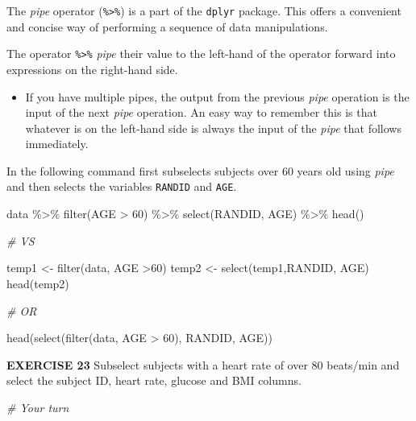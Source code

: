 \documentclass[
]{article}
\newenvironment{Shaded}{\begin{snugshade}}{\end{snugshade}}
\newcommand{\CommentTok}[1]{\textcolor[rgb]{0.56,0.35,0.01}{\textit{#1}}}
\newcommand{\DecValTok}[1]{\textcolor[rgb]{0.00,0.00,0.81}{#1}}
\newcommand{\FunctionTok}[1]{\textcolor[rgb]{0.00,0.00,0.00}{#1}}
\newcommand{\NormalTok}[1]{#1}
\newcommand{\OtherTok}[1]{\textcolor[rgb]{0.56,0.35,0.01}{#1}}
\newcommand{\SpecialCharTok}[1]{\textcolor[rgb]{0.00,0.00,0.00}{#1}}
\providecommand{\tightlist}{%
  \setlength{\itemsep}{0pt}\setlength{\parskip}{0pt}}
\begin{document}
The \emph{pipe} operator (\texttt{\%\textgreater{}\%}) is a part of the
\texttt{dplyr} package. This offers a convenient and concise way of
performing a sequence of data manipulations.

The operator \texttt{\%\textgreater{}\%} \emph{pipe} their value to the
left-hand of the operator forward into expressions on the right-hand
side.

\begin{itemize}
\tightlist
\item
  If you have multiple pipes, the output from the previous \emph{pipe}
  operation is the input of the next \emph{pipe} operation. An easy way
  to remember this is that whatever is on the left-hand side is always
  the input of the \emph{pipe} that follows immediately.
\end{itemize}

In the following command first subselects subjects over 60 years old
using \emph{pipe} and then selects the variables \texttt{RANDID} and
\texttt{AGE}.

\begin{Shaded}
\begin{Highlighting}[]
\NormalTok{data }\SpecialCharTok{\%\textgreater{}\%}
     \FunctionTok{filter}\NormalTok{(AGE }\SpecialCharTok{\textgreater{}} \DecValTok{60}\NormalTok{) }\SpecialCharTok{\%\textgreater{}\%}
     \FunctionTok{select}\NormalTok{(RANDID, AGE) }\SpecialCharTok{\%\textgreater{}\%}
     \FunctionTok{head}\NormalTok{()}

\CommentTok{\# VS }

\NormalTok{temp1 }\OtherTok{\textless{}{-}} \FunctionTok{filter}\NormalTok{(data, AGE }\SpecialCharTok{\textgreater{}}\DecValTok{60}\NormalTok{)}
\NormalTok{temp2 }\OtherTok{\textless{}{-}} \FunctionTok{select}\NormalTok{(temp1,RANDID, AGE)}
\FunctionTok{head}\NormalTok{(temp2)}

\CommentTok{\# OR }

\FunctionTok{head}\NormalTok{(}\FunctionTok{select}\NormalTok{(}\FunctionTok{filter}\NormalTok{(data, AGE }\SpecialCharTok{\textgreater{}} \DecValTok{60}\NormalTok{), RANDID, AGE))}
\end{Highlighting}
\end{Shaded}

\textbf{EXERCISE 23} Subselect subjects with a heart rate of over 80
beats/min and select the subject ID, heart rate, glucose and BMI
columns.

\begin{Shaded}
\begin{Highlighting}[]
\CommentTok{\# Your turn}
\end{Highlighting}
\end{Shaded}
\end{document}
